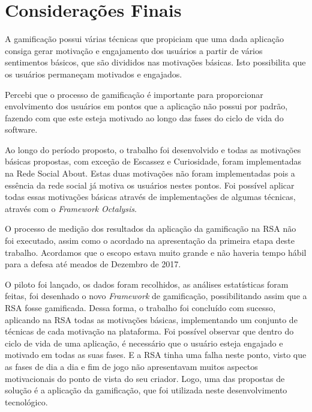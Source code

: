 \chapter[Considerações Finais]{Considerações Finais}
A gamificação possui várias técnicas que propiciam que uma dada aplicação
consiga gerar motivação e engajamento dos usuários a partir de vários sentimentos
básicos, que são divididos nas motivações básicas. Isto possibilita que os
usuários permaneçam motivados e engajados.

Percebi que o processo de gamificação é importante para proporcionar
envolvimento dos usuários em pontos que a aplicação não possui por padrão,
fazendo com que este esteja motivado ao longo das fases do
ciclo de vida do software.

Ao longo do período proposto, o trabalho foi desenvolvido e todas as motivações
básicas propostas, com exceção de Escassez e Curiosidade, foram implementadas na Rede Social About. 
Estas duas motivações não foram implementadas pois a essência da rede social
já motiva os usuários nestes pontos. Foi possível aplicar todas essas motivações básicas
através de implementações de algumas técnicas, através com o \textit{Framework} \textit{Octalysis}.

O processo de medição dos resultados da aplicação da gamificação na RSA não foi executado,
assim como o acordado na apresentação da primeira etapa deste trabalho. Acordamos
que o escopo estava muito grande e não haveria tempo hábil para a defesa até meados de
Dezembro de 2017.

O piloto foi lançado, os dados foram recolhidos, as análises estatísticas foram feitas,
foi desenhado o novo \textit{Framework} de gamificação, possibilitando assim que a RSA
fosse gamificada.
Dessa forma, o trabalho foi concluído com sucesso, aplicando na RSA todas as motivações básicas, 
implementando um conjunto de técnicas de cada motivação na plataforma.
Foi possível observar que dentro do ciclo de vida de uma aplicação, é necessário que o usuário
esteja engajado e motivado em todas as suas fases. E a RSA tinha uma falha neste ponto,
visto que as fases de dia a dia e fim de jogo não apresentavam muitos aspectos motivacionais
do ponto de vista do seu criador.
Logo, uma das propostas de solução é a aplicação da gamificação, que foi utilizada neste
desenvolvimento tecnológico.

%
%
%
